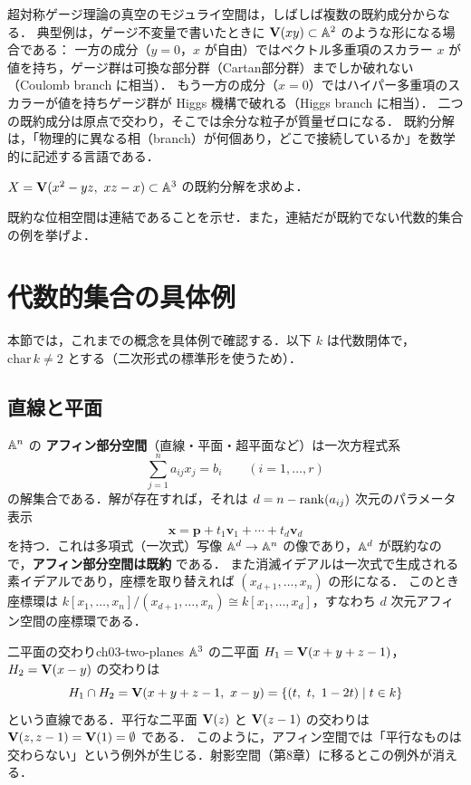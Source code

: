 \begin{physbox}
超対称ゲージ理論の真空のモジュライ空間は，しばしば複数の既約成分からなる．
典型例は，ゲージ不変量で書いたときに $\mathbf{V}(xy)\subset\mathbb{A}^2$ のような形になる場合である：
一方の成分（$y=0$，$x$ が自由）ではベクトル多重項のスカラー $x$ が値を持ち，ゲージ群は可換な部分群（Cartan部分群）までしか破れない（Coulomb branch に相当）．
もう一方の成分（$x=0$）ではハイパー多重項のスカラーが値を持ちゲージ群が Higgs 機構で破れる（Higgs branch に相当）．
二つの既約成分は原点で交わり，そこでは余分な粒子が質量ゼロになる．
既約分解は，「物理的に異なる相（branch）が何個あり，どこで接続しているか」を数学的に記述する言語である．
\end{physbox}

 $X=\mathbf{V}(x^2-yz,\ xz-x)\subset\mathbb{A}^3$ の既約分解を求めよ．

 既約な位相空間は連結であることを示せ．また，連結だが既約でない代数的集合の例を挙げよ．

\section{代数的集合の具体例}

本節では，これまでの概念を具体例で確認する．以下 $k$ は代数閉体で，$\mathrm{char}\,k\ne2$ とする（二次形式の標準形を使うため）．

\subsection{直線と平面}

$\mathbb{A}^n$ の \textbf{アフィン部分空間}（直線・平面・超平面など）は一次方程式系
\[
  \sum_{j=1}^n a_{ij}x_j=b_i\qquad(i=1,\dots,r)
\]
の解集合である．解が存在すれば，それは $d=n-\operatorname{rank}(a_{ij})$ 次元のパラメータ表示
\[
  \bm x=\bm p+t_1\bm v_1+\cdots+t_d\bm v_d
\]
を持つ．これは多項式（一次式）写像 $\mathbb{A}^d\to\mathbb{A}^n$ の像であり，$\mathbb{A}^d$ が既約なので，\textbf{アフィン部分空間は既約} である．
また消滅イデアルは一次式で生成される素イデアルであり，座標を取り替えれば $(x_{d+1},\dots,x_n)$ の形になる．
このとき座標環は $k[x_1,\dots,x_n]/(x_{d+1},\dots,x_n)\cong k[x_1,\dots,x_d]$，すなわち $d$ 次元アフィン空間の座標環である．

\begin{myex}{二平面の交わり}{ch03-two-planes}
$\mathbb{A}^3$ の二平面 $H_1=\mathbf{V}(x+y+z-1)$，$H_2=\mathbf{V}(x-y)$ の交わりは
\[
  H_1\cap H_2=\Zero(x+y+z-1,\ x-y)=\{(t,\ t,\ 1-2t)\mid t\in k\}
\]
という直線である．平行な二平面 $\mathbf{V}(z)$ と $\mathbf{V}(z-1)$ の交わりは $\mathbf{V}(z,z-1)=\mathbf{V}(1)=\emptyset$ である．
このように，アフィン空間では「平行なものは交わらない」という例外が生じる．射影空間（第8章）に移るとこの例外が消える．
\end{myex}

